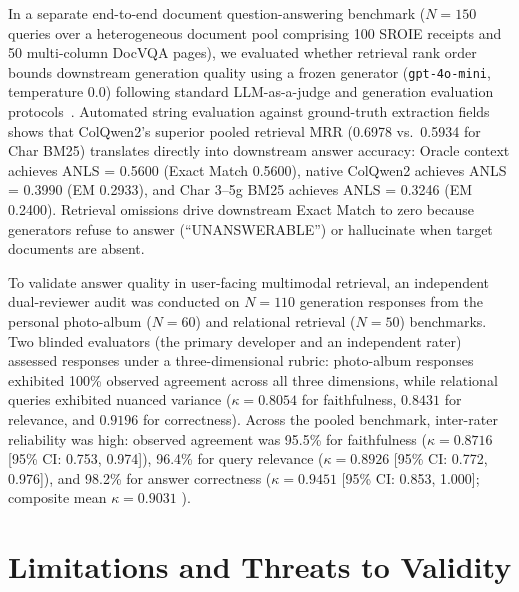 In a separate end-to-end document question-answering benchmark ($N=150$ queries over a heterogeneous document pool comprising 100 SROIE receipts and 50 multi-column DocVQA pages), we evaluated whether retrieval rank order bounds downstream generation quality using a frozen generator (\texttt{gpt-4o-mini}, temperature 0.0) following standard LLM-as-a-judge and generation evaluation protocols~\cite{zheng2023judging}. Automated string evaluation against ground-truth extraction fields shows that ColQwen2's superior pooled retrieval MRR (0.6978 vs.\ 0.5934 for Char BM25) translates directly into downstream answer accuracy: Oracle context achieves ANLS = 0.5600 (Exact Match 0.5600), native ColQwen2 achieves ANLS = 0.3990 (EM 0.2933), and Char 3--5g BM25 achieves ANLS = 0.3246 (EM 0.2400). Retrieval omissions drive downstream Exact Match to zero because generators refuse to answer (``UNANSWERABLE'') or hallucinate when target documents are absent.

To validate answer quality in user-facing multimodal retrieval, an independent dual-reviewer audit was conducted on $N=110$ generation responses from the personal photo-album ($N=60$) and relational retrieval ($N=50$) benchmarks. Two blinded evaluators (the primary developer and an independent rater) assessed responses under a three-dimensional rubric: photo-album responses exhibited 100\% observed agreement across all three dimensions, while relational queries exhibited nuanced variance ($\kappa = 0.8054$ for faithfulness, $0.8431$ for relevance, and $0.9196$ for correctness). Across the pooled benchmark, inter-rater reliability was high: observed agreement was 95.5\% for faithfulness ($\kappa = 0.8716$ [95\% CI: 0.753, 0.974]), 96.4\% for query relevance ($\kappa = 0.8926$ [95\% CI: 0.772, 0.976]), and 98.2\% for answer correctness ($\kappa = 0.9451$ [95\% CI: 0.853, 1.000]; composite mean $\kappa = 0.9031$ \cite{cohen1960coefficient}).

\vspace{-1.5mm}\section{Limitations and Threats to Validity}
\label{sec:limitations}


